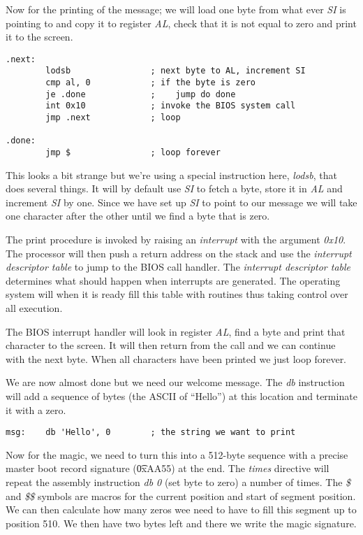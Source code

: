 \documentclass[a4paper,11pt]{article}
\begin{document}
Now for the printing of the message; we will load one byte from what
ever {\em SI} is pointing to and copy it to register {\em AL}, check
that it is not equal to zero and print it to the screen.

\begin{verbatim}
.next:
        lodsb                ; next byte to AL, increment SI
        cmp al, 0            ; if the byte is zero
        je .done             ;    jump do done
        int 0x10             ; invoke the BIOS system call 
        jmp .next            ; loop
        
.done:
        jmp $                ; loop forever
\end{verbatim}

This looks a bit strange but we're using a special instruction here,
{\em lodsb}, that does several things. It will by default use {\em SI}
to fetch a byte, store it in {\em AL} and increment {\em SI} by
one. Since we have set up {\em SI} to point to our message we will
take one character after the other until we find a byte that is zero.

The print procedure is invoked by raising an {\em interrupt} with the
argument {\em 0x10}. The processor will then push a return address on
the stack and use the {\em interrupt descriptor table} to jump to the
BIOS call handler. The {\em interrupt descriptor table} determines
what should happen when interrupts are generated. The operating system
will when it is ready fill this table with routines thus taking
control over all execution.

The BIOS interrupt handler will look in register {\em AL}, find a byte
and print that character to the screen. It will then return from the
call and we can continue with the next byte. When all characters have
been printed we just loop forever.

We are now almost done but we need our welcome message. The {\em
  db} instruction will add a sequence of bytes (the ASCII of
``Hello'') at this location and terminate it with a zero.

\begin{verbatim}
msg:    db 'Hello', 0        ; the string we want to print
\end{verbatim}

Now for the magic, we need to turn this into a 512-byte sequence with
a precise master boot record signature ({\t 0xAA55}) at the end. The
{\em times} directive will repeat the assembly instruction {\em db 0}
(set byte to zero) a number of times. The {\em \$} and {\em \$\$}
symbols are macros for the current position and start of segment
position. We can then calculate how many zeros wee need to have to fill
this segment up to position 510. We then have two bytes left and there
we write the magic signature. 
\end{document}
